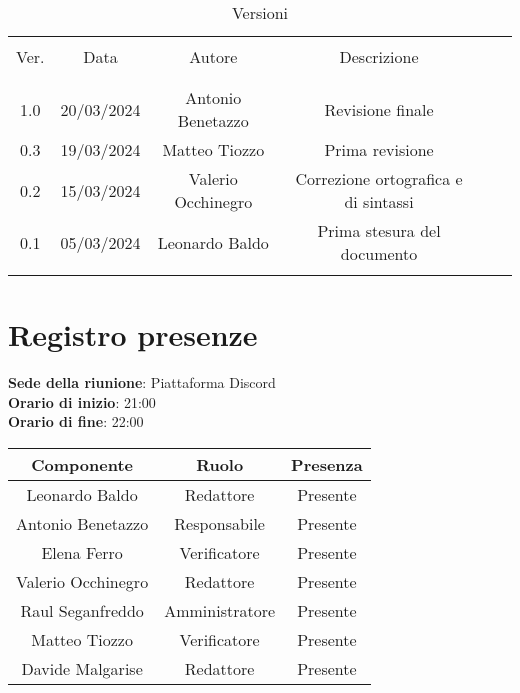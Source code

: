 \documentclass[italian,12pt]{article} %
\begin{document}


\newpage





\begin{table}[!h]
	\caption{Versioni}
	\begin{center}
		\begin{tabular}{ c c c c c c }
			\hline \\[-2ex]
			Ver. & Data & Autore & Descrizione \\
			\\[-2ex] \hline \\[-1.5ex]
			1.0 & 20/03/2024 & Antonio Benetazzo & Revisione finale \\
			0.3 & 19/03/2024 & Matteo Tiozzo & Prima revisione \\
			0.2 & 15/03/2024 & Valerio Occhinegro& Correzione ortografica e di sintassi  \\
			0.1 & 05/03/2024 & Leonardo Baldo& Prima stesura del documento\\
			\\[-1.5ex] \hline
		\end{tabular}
	\end{center}
\end{table}
\newpage

\tableofcontents

\newpage

\section{Registro presenze}


\textbf{Sede della riunione}: Piattaforma Discord\\
\textbf{Orario di inizio}: 21:00\\
\textbf{Orario di fine}: 22:00\\


\begin{flushleft}
	\begin{table}[!h]
	\begin{tabular}{ |c|c|c| } 
		\hline
		\textbf{Componente} & \textbf{Ruolo} & \textbf{Presenza} \\
		\hline 
		Leonardo Baldo 		& Redattore & Presente \\ 
		Antonio Benetazzo 	& Responsabile & Presente \\
		Elena Ferro 		& Verificatore & Presente \\
		Valerio Occhinegro 	& Redattore & Presente \\
		Raul Seganfreddo 	& Amministratore & Presente \\
		Matteo Tiozzo 		& Verificatore & Presente \\ 
		Davide Malgarise 	& Redattore & Presente \\
		\hline
	\end{tabular}
	\end{table}
	\end{flushleft}
\end{document}
